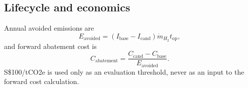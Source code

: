\subsection{Lifecycle and economics}
Annual avoided emissions are
\begin{equation}
E_{\mathrm{avoided}}=(I_{\mathrm{base}}-I_{\mathrm{cand}})
\dot m_{H_2}t_{\mathrm{op}},
\end{equation}
and forward abatement cost is
\begin{equation}
C_{\mathrm{abatement}}=
\frac{C_{\mathrm{cand}}-C_{\mathrm{base}}}
{E_{\mathrm{avoided}}}.
\end{equation}
S\$100/tCO2e is used only as an evaluation threshold, never as an input to the forward cost calculation.

